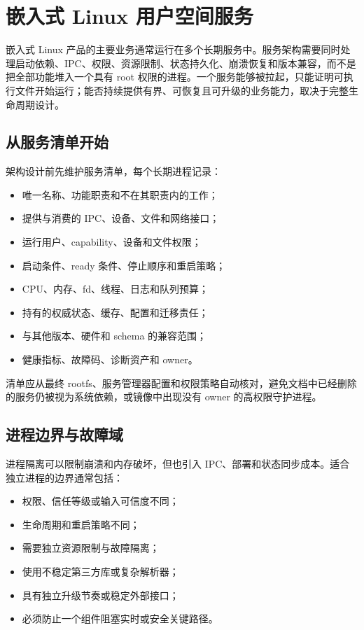 \chapter{嵌入式 Linux 用户空间服务}
\label{chap:linux-userspace-services}

嵌入式 Linux 产品的主要业务通常运行在多个长期服务中。服务架构需要同时处理启动依赖、IPC、权限、资源限制、状态持久化、崩溃恢复和版本兼容，而不是把全部功能堆入一个具有 root 权限的进程。一个服务能够被拉起，只能证明可执行文件开始运行；能否持续提供有界、可恢复且可升级的业务能力，取决于完整生命周期设计。

\section{从服务清单开始}

架构设计前先维护服务清单，每个长期进程记录：

\begin{itemize}
  \item 唯一名称、功能职责和不在其职责内的工作；
  \item 提供与消费的 IPC、设备、文件和网络接口；
  \item 运行用户、capability、设备和文件权限；
  \item 启动条件、ready 条件、停止顺序和重启策略；
  \item CPU、内存、fd、线程、日志和队列预算；
  \item 持有的权威状态、缓存、配置和迁移责任；
  \item 与其他版本、硬件和 schema 的兼容范围；
  \item 健康指标、故障码、诊断资产和 owner。
\end{itemize}

清单应从最终 rootfs、服务管理器配置和权限策略自动核对，避免文档中已经删除的服务仍被视为系统依赖，或镜像中出现没有 owner 的高权限守护进程。

\section{进程边界与故障域}

进程隔离可以限制崩溃和内存破坏，但也引入 IPC、部署和状态同步成本。适合独立进程的边界通常包括：

\begin{itemize}
  \item 权限、信任等级或输入可信度不同；
  \item 生命周期和重启策略不同；
  \item 需要独立资源限制与故障隔离；
  \item 使用不稳定第三方库或复杂解析器；
  \item 具有独立升级节奏或稳定外部接口；
  \item 必须防止一个组件阻塞实时或安全关键路径。
\end{itemize}

